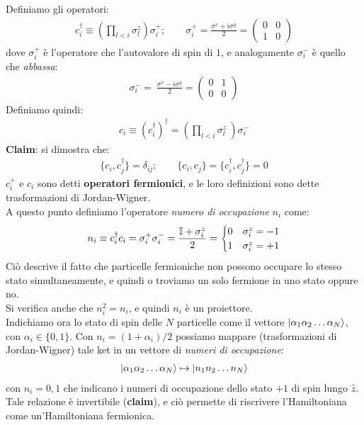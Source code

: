\documentclass[../../InformazioneQuantistica.tex]{subfiles}
\begin{document}
Definiamo gli operatori:
\begin{align*}
c_i^\dag \equiv \left( \prod_{l<i} \sigma_l^z \right) \sigma_i^+; \qquad \sigma_i^+ = \frac{\sigma^x + i\sigma^y}{2} = \begin{pmatrix} 0 & 0\\ 1 & 0\end{pmatrix}
\end{align*}
dove $\sigma_i^+$ è l'operatore che  l'autovalore di spin di $1$, e analogamente $\sigma_i^-$ è quello che \textit{abbassa}:
\begin{align*}
\sigma_i^- =\ \frac{\sigma^x -i\sigma^y}{2} = \begin{pmatrix}0 & 1\\ 0 & 0\end{pmatrix}
\end{align*}
Definiamo quindi:
\begin{align*}
c_i \equiv (c_i^\dag)^\dag = \left(\prod_{l<i} \sigma_l^z\ \right) \sigma_i^-
\end{align*}
\textbf{Claim}: si dimostra che:
\begin{align*}
\{c_i, c_j^\dag\} = \delta_{ij}; \qquad \{c_i, c_j\} = \{c_i^\dag, c_j^\dag\} =0
\end{align*}
$c_i^+$ e $c_i$ sono detti \textbf{operatori fermionici}, e le loro definizioni sono dette trasformazioni di Jordan-Wigner.\\

A questo punto definiamo l'operatore \textit{numero di occupazione} $n_i$ come:
\begin{align*}
n_i \equiv c_i^\dag c_i =\sigma_i^+ \sigma_i^- = \frac{\mathbb{I}+\sigma_i^z}{2} = \begin{cases}
0 & \sigma_i^z = -1\\
1 & \sigma_i^z = +1
\end{cases}
\end{align*}
Ciò descrive il fatto che particelle fermioniche non possono occupare lo stesso stato simultaneamente, e quindi o troviamo un solo fermione in uno stato oppure no.\\
Si verifica anche che $n_i^2 = n_i$, e quindi $n_i$ è un proiettore.\\

Indichiamo ora lo stato di spin delle $N$ particelle come il vettore $\Ket{\alpha_1 \alpha_2 \dots \alpha_N}$, con $\alpha_i \in \{0,1\}$. Con $n_i = (1+\alpha_i)/2$ possiamo mappare (trasformazioni di Jordan-Wigner) tale ket in un vettore di \textit{numeri di occupazione}:
\begin{align*}
\Ket{\alpha_1 \alpha_2\dots \alpha_N} \mapsto \Ket{n_1 n_2 \dots n_N}
\end{align*} 
con $n_i=0,1$ che indicano i numeri di occupazione dello stato $+1$ di spin lungo $\hat{z}$.\\
Tale relazione è invertibile (\textbf{claim}), e ciò permette di riscrivere l'Hamiltoniana come un'Hamiltoniana fermionica.\\
\end{document}
